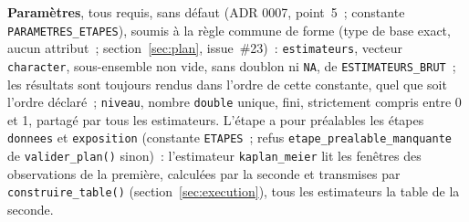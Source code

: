 \documentclass[a4paper,11pt]{article}
\newcommand{\code}[1]{\texttt{\small #1}}
\begin{document}
\medskip
\textbf{Paramètres}, tous requis, sans défaut (ADR 0007, point~5~;
constante \code{PARAMETRES\_ETAPES}), soumis à la règle commune de forme
(type de base exact, aucun attribut~; section~\ref{sec:plan},
issue~\#23)~: \code{estimateurs}, vecteur \code{character},
sous-ensemble non vide, sans doublon ni \code{NA}, de
\code{ESTIMATEURS\_BRUT}~; les résultats sont toujours rendus dans l'ordre
de cette constante, quel que soit l'ordre déclaré~; \code{niveau}, nombre
\code{double} unique, fini, strictement compris entre 0 et 1, partagé par
tous les estimateurs.
L'étape a pour préalables les étapes \code{donnees} et \code{exposition}
(constante \code{ETAPES}~; refus \code{etape\_prealable\_manquante} de
\code{valider\_plan()} sinon)~: l'estimateur \code{kaplan\_meier} lit les
fenêtres des observations de la première, calculées par la seconde et
transmises par \code{construire\_table()} (section~\ref{sec:execution}),
tous les estimateurs la table de la seconde.
\end{document}
